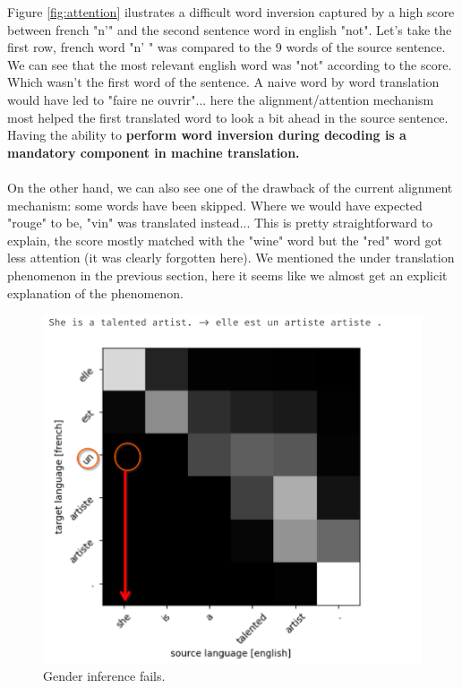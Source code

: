 \documentclass[a4paper]{article}
\begin{document}
Figure \ref{fig:attention}  ilustrates a difficult word inversion captured by a high score between french "n'" and the second sentence word in english "not". Let's take the first row, french word "n' " was compared to the 9 words of the source sentence.
We can see that the most relevant english word was "not" according to the score. Which wasn't the first word of the sentence. A naive word by word translation would have led to "faire ne ouvrir"... here the alignment/attention mechanism most helped the first translated word to look a bit ahead in the source sentence. \\
Having the ability to \textbf{perform word inversion during decoding is a mandatory component in machine translation.}\\ \\
On the other hand, we can also see one of the drawback of the current alignment mechanism: some words have been skipped. Where we would have expected "rouge" to be, "vin" was translated instead... This is pretty straightforward to explain, the score mostly matched with the "wine" word but the "red" word got less attention (it was clearly forgotten here). We mentioned the under translation phenomenon in the previous section, here it seems like we almost get an explicit explanation of the phenomenon.\\


\begin{figure}[H]
    \centering
	\includegraphics[width=.6\textwidth]{figures/gender_issue.png}
	\caption{Gender inference fails.\label{fig:Gender}}
\end{figure}
\end{document}
